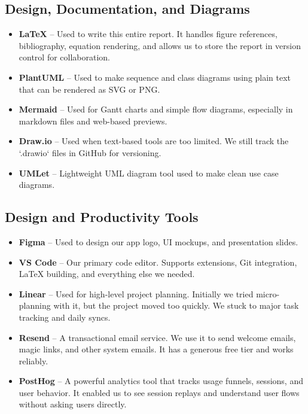 \subsection{Design, Documentation, and Diagrams}

\begin{itemize}
    \item \textbf{LaTeX} – Used to write this entire report. It handles figure references, bibliography, equation rendering, and allows us to store the report in version control for collaboration.
    \item \textbf{PlantUML} – Used to make sequence and class diagrams using plain text that can be rendered as SVG or PNG.
    \item \textbf{Mermaid} – Used for Gantt charts and simple flow diagrams, especially in markdown files and web-based previews.
    \item \textbf{Draw.io} – Used when text-based tools are too limited. We still track the `.drawio` files in GitHub for versioning.
    \item \textbf{UMLet} – Lightweight UML diagram tool used to make clean use case diagrams.
\end{itemize}

\subsection{Design and Productivity Tools}

\begin{itemize}
    \item \textbf{Figma} – Used to design our app logo, UI mockups, and presentation slides.
    \item \textbf{VS Code} – Our primary code editor. Supports extensions, Git integration, LaTeX building, and everything else we needed.
    \item \textbf{Linear} – Used for high-level project planning. Initially we tried micro-planning with it, but the project moved too quickly. We stuck to major task tracking and daily syncs.
    \item \textbf{Resend} – A transactional email service. We use it to send welcome emails, magic links, and other system emails. It has a generous free tier and works reliably.
    \item \textbf{PostHog} – A powerful analytics tool that tracks usage funnels, sessions, and user behavior. It enabled us to see session replays and understand user flows without asking users directly.
\end{itemize}

